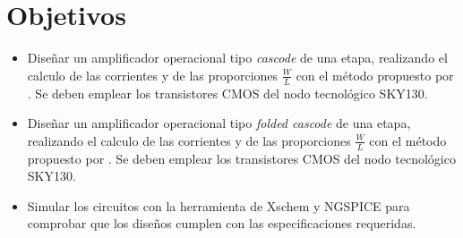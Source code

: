 \section{Objetivos \label{sec:obj}}


\begin{itemize} 
	\item Diseñar un amplificador operacional tipo \textit{cascode} de una etapa, realizando el calculo de las corrientes y de las proporciones $\frac{W}{L}$ con el método propuesto por \cite{Allen_2012}. Se deben emplear los transistores CMOS del nodo tecnológico SKY130.
	\item Diseñar un amplificador operacional tipo \textit{folded cascode} de una etapa, realizando el calculo de las corrientes y de las proporciones $\frac{W}{L}$ con el método propuesto por \cite{Allen_2012}. Se deben emplear los transistores CMOS del nodo tecnológico SKY130.
	\item Simular los circuitos con la herramienta de Xschem y NGSPICE para comprobar que los diseños cumplen con las especificaciones requeridas.	
\end{itemize}
